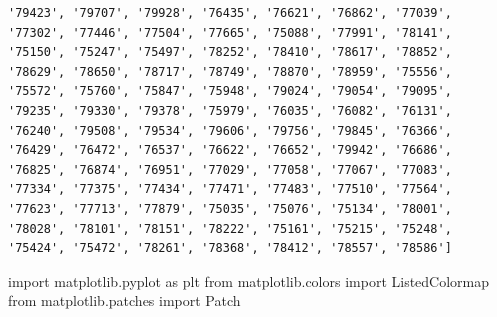 \documentclass[
  letterpaper,
  DIV=11,
  numbers=noendperiod]{scrartcl}
\newenvironment{Shaded}{\begin{snugshade}}{\end{snugshade}}
\newcommand{\ImportTok}[1]{\textcolor[rgb]{0.00,0.46,0.62}{#1}}
\newcommand{\NormalTok}[1]{\textcolor[rgb]{0.00,0.23,0.31}{#1}}
\begin{document}
\begin{verbatim}
'79423', '79707', '79928', '76435', '76621', '76862', '77039', '77302', '77446', '77504', '77665', '75088', '77991', '78141', '75150', '75247', '75497', '78252', '78410', '78617', '78852', '78629', '78650', '78717', '78749', '78870', '78959', '75556', '75572', '75760', '75847', '75948', '79024', '79054', '79095', '79235', '79330', '79378', '75979', '76035', '76082', '76131', '76240', '79508', '79534', '79606', '79756', '79845', '76366', '76429', '76472', '76537', '76622', '76652', '79942', '76686', '76825', '76874', '76951', '77029', '77058', '77067', '77083', '77334', '77375', '77434', '77471', '77483', '77510', '77564', '77623', '77713', '77879', '75035', '75076', '75134', '78001', '78028', '78101', '78151', '78222', '75161', '75215', '75248', '75424', '75472', '78261', '78368', '78412', '78557', '78586']
\end{verbatim}

\begin{Shaded}
\begin{Highlighting}[]
\ImportTok{import}\NormalTok{ matplotlib.pyplot }\ImportTok{as}\NormalTok{ plt}
\ImportTok{from}\NormalTok{ matplotlib.colors }\ImportTok{import}\NormalTok{ ListedColormap}
\ImportTok{from}\NormalTok{ matplotlib.patches }\ImportTok{import}\NormalTok{ Patch}
\end{Highlighting}
\end{Shaded}
\end{document}
